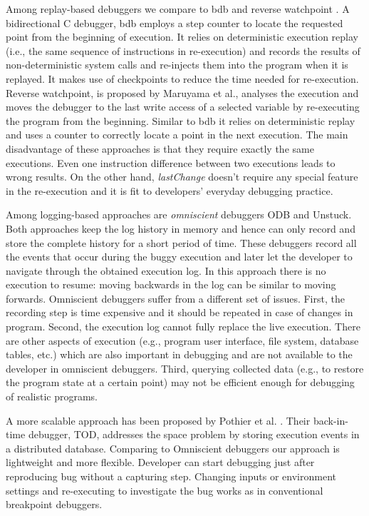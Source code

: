 \documentclass{sig-alternate}
\begin{document}
Among replay-based debuggers we compare to bdb \cite{Boothe} and
reverse watchpoint \cite{Maruyama}.  A bidirectional C debugger, bdb
employs a step counter to locate the requested point from the
beginning of execution. It relies on deterministic execution replay
(i.e., the same sequence of instructions in re-execution) and records
the results of non-deterministic system calls and re-injects them into
the program when it is replayed. It makes use of checkpoints to reduce
the time needed for re-execution.  Reverse watchpoint, is proposed by
Maruyama et al., analyses the execution and moves the debugger to the
last write access of a selected variable by re-executing the program
from the beginning\cite{Maruyama}.  Similar to bdb it relies on deterministic
replay and uses a counter to correctly locate a point in the next
execution. The main disadvantage of these approaches is that they require 
exactly the same executions. Even one instruction difference between
two executions leads to wrong results. On the other hand,
\textit{lastChange} doesn't require any special feature in the
re-execution and it is fit to  developers' everyday debugging
practice.

Among logging-based approaches are \textit{omniscient} debuggers
ODB\cite{Lewis} and Unstuck\cite{Hofer}. Both
approaches keep the log history in memory and hence can only record
and store the complete history for a short period of time. These
debuggers record all the events that occur during the buggy execution
and later let the developer to navigate through the obtained execution
log. In this approach there is no execution to resume: moving
backwards in the log can be similar to moving forwards. Omniscient
debuggers suffer from a different set of issues. First, the recording
step is time expensive and it should be repeated in case of changes in
program. Second, the execution log cannot fully replace the live
execution. There are other aspects of execution (e.g., program user
interface, file system, database tables, etc.) which are also
important in debugging and are not available to the developer in
omniscient debuggers. Third, querying collected data (e.g., to restore
the program state at a certain point) may not be efficient enough for
debugging of realistic programs.

A more scalable approach has been proposed by Pothier et
al. \cite{Pothier}. Their back-in-time debugger, TOD, addresses the
space problem by storing execution events in a distributed
database. Comparing to Omniscient debuggers our approach is
lightweight and more flexible. Developer can start debugging just
after reproducing bug without a capturing step.  Changing inputs or
environment settings and re-executing to investigate the bug works as
in conventional breakpoint debuggers.
\end{document}
